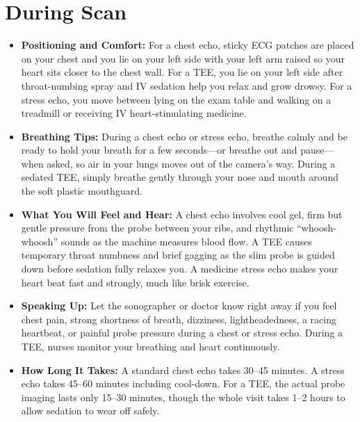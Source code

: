 \section{During Scan}
\begin{itemize}
\item \textbf{Positioning and Comfort:} For a chest echo, sticky ECG patches are placed on your chest and you lie on your left side with your left arm raised so your heart sits closer to the chest wall. For a TEE, you lie on your left side after throat-numbing spray and IV sedation help you relax and grow drowsy. For a stress echo, you move between lying on the exam table and walking on a treadmill or receiving IV heart-stimulating medicine.
\item \textbf{Breathing Tips:} During a chest echo or stress echo, breathe calmly and be ready to hold your breath for a few seconds---or breathe out and pause---when asked, so air in your lungs moves out of the camera's way. During a sedated TEE, simply breathe gently through your nose and mouth around the soft plastic mouthguard.
\item \textbf{What You Will Feel and Hear:} A chest echo involves cool gel, firm but gentle pressure from the probe between your ribs, and rhythmic ``whoosh-whoosh'' sounds as the machine measures blood flow. A TEE causes temporary throat numbness and brief gagging as the slim probe is guided down before sedation fully relaxes you. A medicine stress echo makes your heart beat fast and strongly, much like brisk exercise.
\item \textbf{Speaking Up:} Let the sonographer or doctor know right away if you feel chest pain, strong shortness of breath, dizziness, lightheadedness, a racing heartbeat, or painful probe pressure during a chest or stress echo. During a TEE, nurses monitor your breathing and heart continuously.
\item \textbf{How Long It Takes:} A standard chest echo takes 30--45 minutes. A stress echo takes 45--60 minutes including cool-down. For a TEE, the actual probe imaging lasts only 15--30 minutes, though the whole visit takes 1--2 hours to allow sedation to wear off safely.
\end{itemize}



